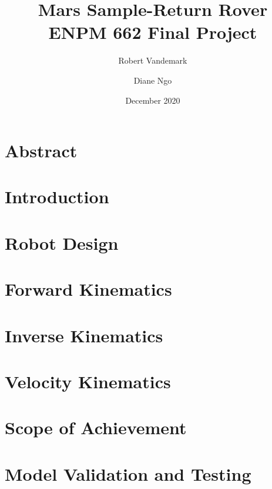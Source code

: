 \documentclass[a4paper, 12pt]{report}
\title{Mars Sample-Return Rover \\
\large ENPM 662 Final Project}
\date{December 2020}
\author{Robert Vandemark \and Diane Ngo}
\begin{document}
	
	\setcounter{page}{1}
	\maketitle
	
	\tableofcontents
	\newpage
	
	\chapter{Abstract}
	

	\chapter{Introduction}
	

	\chapter{Robot Design}
	

	\chapter{Forward Kinematics}
	

	\chapter{Inverse Kinematics}
	

	\chapter{Velocity Kinematics}
	

	\chapter{Scope of Achievement}
	

	\chapter{Model Validation and Testing}
	
	\begin{center}
		\printbibliography[heading=bibintoc, title={Bibliography}]
	\end{center}
\end{document}
